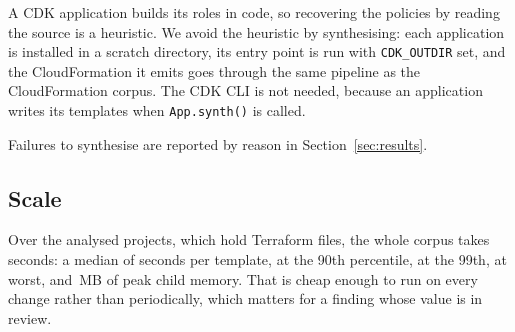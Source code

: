 A CDK application builds its roles in code, so recovering the policies by
reading the source is a heuristic. We avoid the heuristic by synthesising:
each application is installed in a scratch directory, its entry point is run
with \texttt{CDK\_OUTDIR} set, and the CloudFormation it emits goes through
the same pipeline as the CloudFormation corpus. The CDK CLI is not needed,
because an application writes its templates when \texttt{App.synth()} is
called.

Failures to synthesise are reported by reason in Section~\ref{sec:results}.

\subsection{Scale}

Over the \nProjects analysed projects, which hold \nTerraformFiles Terraform
files, the whole corpus takes \corpusSeconds seconds: a median of
\medianSeconds seconds per template, \pNinetySeconds at the 90th percentile,
\pNinetyNineSeconds at the 99th, \maxSeconds at worst, and \peakMemoryMB\,MB
of peak child memory. That is cheap enough to run on every change rather than
periodically, which matters for a finding whose value is in review.
